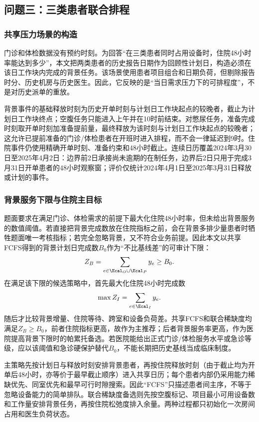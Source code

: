 \subsection{问题三：三类患者联合排程}

\subsubsection{共享压力场景的构造}

门诊和体检数据没有预约时刻。为回答“在三类患者同时占用设备时，住院48小时率能达到多少”，本文把两类患者的历史报告日期作为回顾性计划日，构造必须在该日工作块内完成的背景任务。该场景使用患者项目组合和日期负荷，但剔除报告时分、历史机房与历史医生。因此，它反映的是“当日需求压力下的可排程度”，不是对历史派单的重放。

背景事件的基础释放时刻为历史开单时刻与计划日工作块起点的较晚者，截止为计划日工作块终点；空腹任务只能进入上午并在10时前结束。对憋尿任务，准备完成时刻取开单时刻加准备提前量，最终释放为该时刻与计划日工作块起点的较晚者；这允许已提前准备的门诊/体检患者在开班时进入排程，而不会一律延迟到9时。住院事件仍使用精确开单时刻、准备约束和48小时截止。连续日历覆盖2024年3月30日至2025年4月2日：边界前2日承接尚未逾期的在制任务，边界后2日只用于完成3月31日开单患者的48小时观察窗；评价仅统计2024年4月1日至2025年3月31日释放或计划的事件。

\subsubsection{背景服务下限与住院主目标}

题面要求在满足门诊、体检需求的前提下最大化住院48小时率，但未给出背景服务的数值阈值。若直接把背景完成数放在住院指标之前，会在背景多排少量患者时牺牲题面唯一考核指标；若完全忽略背景，又不符合业务前提。因此本文以共享FCFS得到的背景计划日完成数$B_0$作为“不比基线差”的可审计下限：
\begin{equation}
  Z_B=\sum_{e\in\Ecal_O\cup\Ecal_P}y_e\geq B_0.
\end{equation}
在满足该下限的候选策略中，首先最大化住院48小时完成数
\begin{equation}
  \max Z_I=\sum_{e\in\Ecal_I}y_e.
\end{equation}
随后才比较背景增量、住院等待、跨室和设备负荷差。共享FCFS和联合稀缺度均满足$Z_B\geq B_0$，前者住院指标更高，故作为主推荐；后者背景服务率更高，作为医院提高背景下限时的帕累托备选。若医院能给出正式门诊/体检服务水平或急诊等级，应以该阈值和急诊硬保护替代$B_0$，不能长期把历史基线当成临床制度。

主策略先按计划日与释放时刻安排背景患者，再按住院释放时刻（由于截止均为开单后48小时，亦等价于最早截止顺序）进入共享日历；每个患者内部仍采用能力稀缺优先、同室优先和最早可行时隙搜索。因此“FCFS”只描述患者间主序，不等于忽略设备能力的简单排队。联合稀缺度备选则先按空腹标记、项目最小可用设备数和工作量安排背景任务，再按住院松弛度排入余量。两种过程都只初始化一次房间占用和医生负荷状态。

